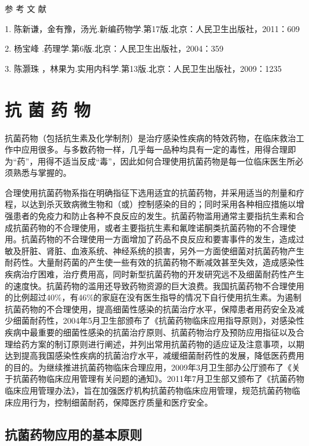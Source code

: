 \protect\hypertarget{text00429.html}{}{}

\hypertarget{text00429.htmlux5cux23CHP17-6-6}{}
参 考 文 献

1.
陈新谦，金有豫，汤光.新编药物学.第17版.北京：人民卫生出版社，2011：609

2. 杨宝峰 .药理学.第6版.北京：人民卫生出版社，2004：359

3. 陈灏珠 ，林果为.实用内科学.第13版.北京：人民卫生出版社，2009：1235

\protect\hypertarget{text00430.html}{}{}

\chapter{抗 菌 药 物}

抗菌药物（包括抗生素及化学制剂）是治疗感染性疾病的特效药物，在临床救治工作中应用很多。与多数药物一样，几乎每一品种均具有一定的毒性，用得合理即为“药”，用得不适当反成“毒”，因此如何合理使用抗菌药物是每一位临床医生所必须熟悉与掌握的。

合理使用抗菌药物系指在明确指征下选用适宜的抗菌药物，并采用适当的剂量和疗程，以达到杀灭致病微生物和（或）控制感染的目的；同时采用各种相应措施以增强患者的免疫力和防止各种不良反应的发生。抗菌药物滥用通常主要指抗生素和合成抗菌药物的不合理使用，或者主要指抗生素和氟喹诺酮类抗菌药物的不合理使用。抗菌药物的不合理使用一方面增加了药品不良反应和要害事件的发生，造成过敏及肝脏、肾脏、血液系统、神经系统的损害，另外一方面使细菌对抗菌药物产生耐药性。大量耐药菌的产生使一些有效的抗菌药物不断减效甚至失效，造成感染性疾病治疗困难，治疗费用高，同时新型抗菌药物的开发研究远不及细菌耐药性产生的速度快。抗菌药物的滥用还导致药物资源的巨大浪费。我国抗菌药物不合理使用的比例超过40\%，有46\%的家庭在没有医生指导的情况下自行使用抗生素。为遏制抗菌药物的不合理使用，提高细菌性感染的抗菌治疗水平，保障患者用药安全及减少细菌耐药性，2004年5月卫生部颁布了《抗菌药物临床应用指导原则》，对感染性疾病中最重要的细菌性感染的抗菌治疗原则、抗菌药物治疗及预防应用指征以及合理给药方案的制订原则进行阐述，并列出常用抗菌药物的适应证及注意事项，以期达到提高我国感染性疾病的抗菌治疗水平，减缓细菌耐药性的发展，降低医药费用的目的。为继续推进抗菌药物临床合理应用，2009年3月卫生部办公厅颁布了《关于抗菌药物临床应用管理有关问题的通知》。2011年7月卫生部又颁布了《抗菌药物临床应用管理办法》，旨在加强医疗机构抗菌药物临床应用管理，规范抗菌药物临床应用行为，控制细菌耐药，保障医疗质量和医疗安全。

\section{抗菌药物应用的基本原则}

